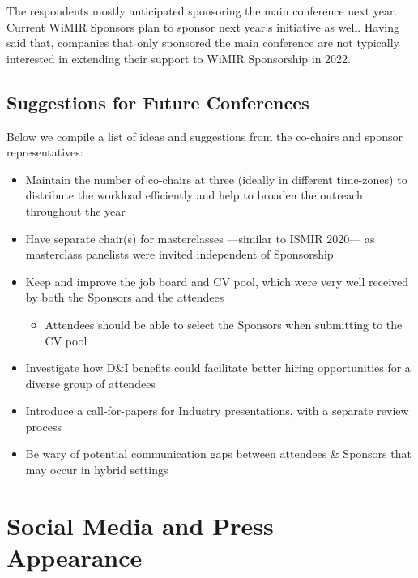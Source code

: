 \documentclass[%
10pt,								%
titlepage,						%
]
{scrartcl}
\begin{document}
        The respondents mostly anticipated sponsoring the main conference next year. Current WiMIR Sponsors plan to sponsor next year's initiative as well. Having said that, companies that only sponsored the main conference are not typically interested in extending their support to WiMIR Sponsorship in 2022.
        
    \subsection{Suggestions for Future Conferences}
        Below we compile a list of ideas and suggestions from the co-chairs and sponsor representatives:
        \begin{itemize}
            \item   Maintain the number of co-chairs at three (ideally in different time-zones) to distribute the workload efficiently and help to broaden the outreach throughout the year 
            \item   Have separate chair(s) for masterclasses ---similar to ISMIR 2020--- as masterclass panelists were invited independent of Sponsorship
            \item   Keep and improve the job board and CV pool, which were very well received by both the Sponsors and the attendees
            \begin{itemize}
                \item Attendees should be able to select the Sponsors when submitting to the CV pool
            \end{itemize}
            \item   Investigate how D\&I benefits could facilitate better hiring opportunities for a diverse group of attendees
            \item   Introduce a call-for-papers for Industry presentations, with a separate review process 
            \item   Be wary of potential communication gaps between attendees \& Sponsors that may occur in hybrid settings
        \end{itemize}


\section{Social Media and Press Appearance}
\end{document}
